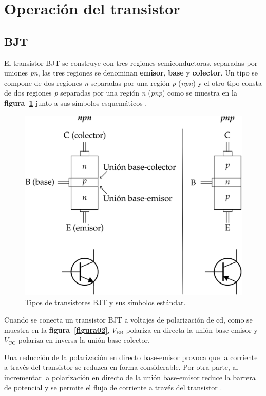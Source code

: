 \section{Operación del transistor}

\subsection{BJT}
El transistor BJT se construye con tres regiones semiconductoras, separadas por
uniones \emph{pn}, las tres regiones se denominan \textbf{emisor}, \textbf{base}
y \textbf{colector}. Un tipo se compone de dos regiones \emph{n} separadas por
una región \emph{p} (\emph{npn}) y el otro tipo consta de dos regiones \emph{p}
separadas por una región \emph{n} (\emph{pnp}) como se muestra en la
\textbf{figura~\ref{figura01}} junto a sus símbolos esquemáticos \cite{Floyd}.

\begin{figure}[!ht]
\centering
\includegraphics[scale=0.30]{diagramas/figura01.eps}
\caption{Tipos de transistores BJT y sus símbolos estándar.}
\label{figura01}
\end{figure}

Cuando se conecta un transistor BJT a voltajes de polarización de cd, como se
muestra en la \textbf{figura~\ref{figura02}}, $V_{\text{BB}}$ polariza en
directa la unión base-emisor y $V_{\text{CC}}$ polariza en inversa la unión
base-colector.

Una reducción de la polarización en directo base-emisor provoca que la corriente
a través del transistor se reduzca en forma considerable. Por otra parte, al
incrementar la polarización en directo de la unión base-emisor reduce la barrera
de potencial y se permite el flujo de corriente a través del transistor
\cite{Savant}.


